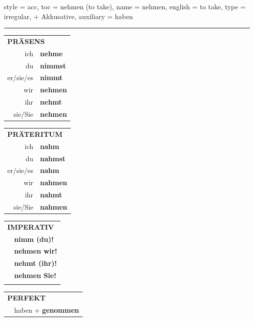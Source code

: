 \begin{verbentry}{
  style = {acc},
  toc = {nehmen (to take)},
  name = {nehmen},
  english = {to take},
  type = {irregular, + Akkusative},
  auxiliary = {haben}
}
 
    
     \vspace{5pt}

    \hrule
    
    \vspace{5pt}

  \begin{tabular}{rl}
     \multicolumn{2}{l}{\textbf{PRÄSENS} }\\
    ich & \textbf{nehme}\\
    du & \textbf{nimmst}\\
    er/sie/es & \textbf{nimmt}\\
    wir & \textbf{nehmen}\\
    ihr & \textbf{nehmt}\\
    sie/Sie & \textbf{nehmen}\\
  \end{tabular}
  \hfill
     \begin{tabular}{rl}
    \multicolumn{2}{l}{\textbf{PRÄTERITUM} }\\
    ich & \textbf{nahm}\\
    du & \textbf{nahmst}\\
    er/sie/es & \textbf{nahm}\\
    wir & \textbf{nahmen}\\
    ihr & \textbf{nahmt}\\
    sie/Sie & \textbf{nahmen}\\
  \end{tabular}
  \hfill
  \begin{tabular}{rl}
     \multicolumn{2}{l}{\textbf{IMPERATIV} }\\
   & \textbf{nimm (du)!}\\
   & \textbf{nehmen wir!}\\
   & \textbf{nehmt (ihr)!}\\
   & \textbf{nehmen Sie!}\\
   & \vspace{10pt}
  \end{tabular}

    \vspace{10pt}

 \begin{tabular}{rl}
     \multicolumn{2}{l}{\textbf{PERFEKT}}\\
  &  haben + \textbf{genommen}\\
  \end{tabular}
\hfill
   \begin{tabular}{rl}
   

\end{tabular}
\end{verbentry}

